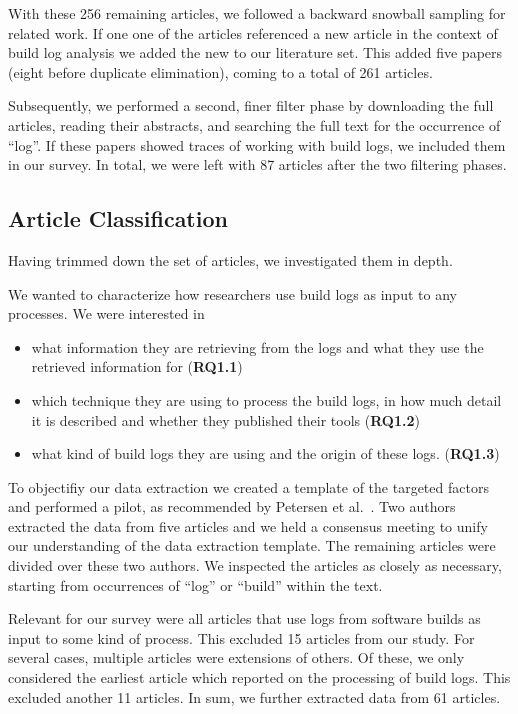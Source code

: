 With these 256 remaining articles, we followed a backward snowball
sampling for related work.
If one one of the articles referenced a new article in the context
of build log analysis we added the new to our literature set.
This added five papers (eight before
duplicate elimination), coming to a total of 261
articles.

Subsequently, we performed a second, finer filter phase by downloading the
full articles, reading their abstracts, and searching the full text
for the occurrence of ``log''.
If these papers showed traces of
working with build logs, we included them in our survey.
In total, we
were left with 87 articles after the two filtering phases.

\subsection{Article Classification}
Having trimmed down the set of articles, we investigated them in depth.

We wanted to characterize how researchers use build logs as input to
any processes.
We were interested in
\begin{itemize}
  \item what information they are retrieving from the logs and
  what they use the retrieved information for (\textbf{RQ1.1})
  \item which technique they are using to process the build logs,
  in how much detail it is described and whether they published their
  tools (\textbf{RQ1.2})
  \item what kind of build logs they are using and the origin of these
  logs.
(\textbf{RQ1.3})
\end{itemize}
To objectifiy our data extraction we created a template of the targeted
factors and performed a pilot, as recommended by Petersen et
al.~\cite{petersen2015guidelines}.
Two authors extracted the data from five articles and we held a
consensus meeting to unify our understanding
of the data extraction template.
The remaining articles were divided over these two authors.
We inspected the articles as closely as necessary,
starting from occurrences of ``log'' or ``build'' within the text.

Relevant for our survey were all articles that
use logs from software builds as input to
some kind of process.
This excluded 15 articles from our study.
For several cases, multiple articles were extensions of others.
Of these, we only considered the earliest article which reported on
the processing of build logs.
This excluded another 11 articles.
In sum, we further extracted data from 61 articles.

